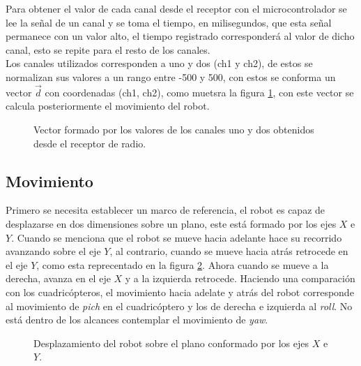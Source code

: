 \documentclass{iccmemoria}
\begin{document}
Para obtener el valor de cada canal desde el receptor con el microcontrolador se lee la señal de un canal y se toma el tiempo, en milisegundos, que esta señal permanece con un valor alto, el tiempo registrado corresponderá al valor de dicho canal, esto se repite para el resto de los canales.\\
 
Los canales utilizados corresponden a uno y dos (ch1 y ch2), de estos se normalizan sus valores a un rango entre -500 y 500, con estos se conforma un vector $\vec{d}$ con coordenadas (ch1, ch2), como muetsra la figura \ref{fig:radio_values}, con este vector se calcula posteriormente el movimiento del robot.\\

\begin{figure}[H]
  \centering
  \selectfont{
  
  }
  \caption[Vector formado por las entradas de radio]{Vector formado por los valores de los canales uno y dos obtenidos desde el receptor de radio.}
  \label{fig:radio_values}
\end{figure}

\subsection{Movimiento}

Primero se necesita establecer un marco de referencia, el robot es capaz de desplazarse en dos dimensiones sobre un plano, este está formado por los ejes $X$ e $Y$. Cuando se menciona que el robot se mueve hacia adelante hace su recorrido avanzando sobre el eje $Y$, al contrario, cuando se mueve hacia atrás retrocede en el eje $Y$, como esta reprecentado en la figura \ref{fig:omni_direcition}. Ahora cuando se mueve a la derecha, avanza en el eje $X$ y a la izquierda retrocede. Haciendo una comparación con los cuadricópteros, el movimiento hacia adelate y atrás del robot corresponde al movimiento de \emph{pich} en el cuadricóptero y los de derecha e izquierda al \emph{roll}. No está dentro de los alcances contemplar el movimiento de \emph{yaw}.\\

\begin{figure}[H]
  \centering
  \selectfont{
  
  }
  \caption[Desplazamiento del robot sobre el plano $XY$.]{Desplazamiento del robot sobre el plano conformado por los ejes $X$ e $Y$.}
  \label{fig:omni_direcition}
\end{figure}
\end{document}
